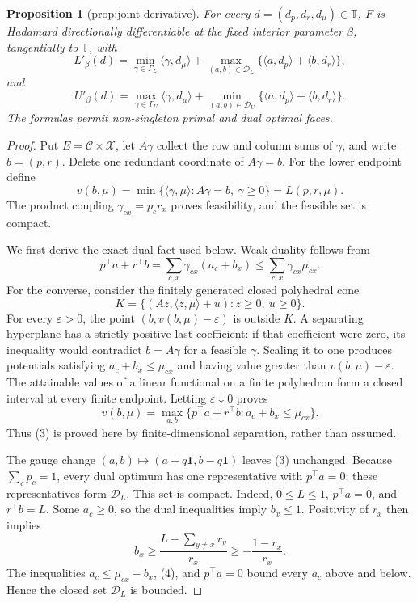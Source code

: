 \documentclass{article}
\newtheorem{proposition}{Proposition}
\begin{document}
\begin{proposition}[prop:joint-derivative]\label{prop:joint-derivative}
For every \(d=(d_p,d_r,d_\mu)\in\mathbb T\), \(F\) is Hadamard directionally differentiable at the fixed interior parameter \(\beta\), tangentially to \(\mathbb T\), with \[L'_\beta(d)=\min_{\gamma\in\Gamma_L}\langle\gamma,d_\mu\rangle+\max_{(a,b)\in\mathcal D_L}\{\langle a,d_p\rangle+\langle b,d_r\rangle\},\] and \[U'_\beta(d)=\max_{\gamma\in\Gamma_U}\langle\gamma,d_\mu\rangle+\min_{(a,b)\in\mathcal D_U}\{\langle a,d_p\rangle+\langle b,d_r\rangle\}.\] The formulas permit non-singleton primal and dual optimal faces.
\end{proposition}
\begin{proof}
Put \(E=\mathcal C\times\mathcal X\), let \(A\gamma\) collect the row and column sums of \(\gamma\), and write \(b=(p,r)\).  Delete one redundant coordinate of \(A\gamma=b\).  For the lower endpoint define
\[
v(b,\mu)=\min\{\langle\gamma,\mu\rangle:A\gamma=b,\ \gamma\geq0\}=L(p,r,\mu).
\tag{1}
\]
The product coupling \(\gamma_{cx}=p_cr_x\) proves feasibility, and the feasible set is compact.

We first derive the exact dual fact used below.  Weak duality follows from
\[
p^\top a+r^\top b
=\sum_{c,x}\gamma_{cx}(a_c+b_x)
\leq\sum_{c,x}\gamma_{cx}\mu_{cx}.
\tag{2}
\]
For the converse, consider the finitely generated closed polyhedral cone
\[
K=\{(Az,\langle z,\mu\rangle+u):z\geq0,\ u\geq0\}.
\]
For every \(\varepsilon>0\), the point \((b,v(b,\mu)-\varepsilon)\) is outside \(K\).  A separating hyperplane has a strictly positive last coefficient: if that coefficient were zero, its inequality would contradict \(b=A\gamma\) for a feasible \(\gamma\).  Scaling it to one produces potentials satisfying \(a_c+b_x\leq\mu_{cx}\) and having value greater than \(v(b,\mu)-\varepsilon\).  The attainable values of a linear functional on a finite polyhedron form a closed interval at every finite endpoint.  Letting \(\varepsilon\downarrow0\) proves
\[
v(b,\mu)=
\max_{a,b}\{p^\top a+r^\top b:a_c+b_x\leq\mu_{cx}\}.
\tag{3}
\]
Thus (3) is proved here by finite-dimensional separation, rather than assumed.

The gauge change \((a,b)\mapsto(a+q\mathbf 1,b-q\mathbf 1)\) leaves (3) unchanged.  Because \(\sum_cp_c=1\), every dual optimum has one representative with \(p^\top a=0\); these representatives form \(\mathcal D_L\).  This set is compact.  Indeed, \(0\leq L\leq1\), \(p^\top a=0\), and \(r^\top b=L\).  Some \(a_c\geq0\), so the dual inequalities imply \(b_x\leq1\).  Positivity of \(r_x\) then implies
\[
b_x\geq\frac{L-\sum_{y\neq x}r_y}{r_x}\geq-\frac{1-r_x}{r_x}.
\tag{4}
\]
The inequalities \(a_c\leq\mu_{cx}-b_x\), (4), and \(p^\top a=0\) bound every \(a_c\) above and below.  Hence the closed set \(\mathcal D_L\) is bounded.


\end{proof}
\end{document}
